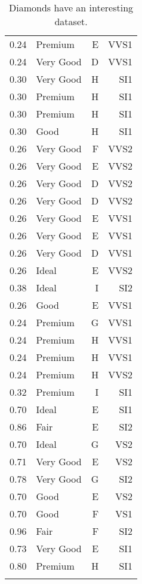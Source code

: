 \documentclass[12pt,english,nohyper]{tufte-handout}\usepackage[]{graphicx}\usepackage[]{color}
\begin{document}
\begin{fullwidth}
\begin{longtable}{r|lr|r}
  0.24 & Premium & E & VVS1 \\ 
  0.24 & Very Good & D & VVS1 \\ 
  0.30 & Very Good & H & SI1 \\ 
  0.30 & Premium & H & SI1 \\ 
  0.30 & Premium & H & SI1 \\ 
  0.30 & Good & H & SI1 \\ 
  0.26 & Very Good & F & VVS2 \\ 
  0.26 & Very Good & E & VVS2 \\ 
  0.26 & Very Good & D & VVS2 \\ 
  0.26 & Very Good & D & VVS2 \\ 
  0.26 & Very Good & E & VVS1 \\ 
  0.26 & Very Good & E & VVS1 \\ 
  0.26 & Very Good & D & VVS1 \\ 
  0.26 & Ideal & E & VVS2 \\ 
  0.38 & Ideal & I & SI2 \\ 
  0.26 & Good & E & VVS1 \\ 
  0.24 & Premium & G & VVS1 \\ 
  0.24 & Premium & H & VVS1 \\ 
  0.24 & Premium & H & VVS1 \\ 
  0.24 & Premium & H & VVS2 \\ 
  0.32 & Premium & I & SI1 \\ 
  0.70 & Ideal & E & SI1 \\ 
  0.86 & Fair & E & SI2 \\ 
  0.70 & Ideal & G & VS2 \\ 
  0.71 & Very Good & E & VS2 \\ 
  0.78 & Very Good & G & SI2 \\ 
  0.70 & Good & E & VS2 \\ 
  0.70 & Good & F & VS1 \\ 
  0.96 & Fair & F & SI2 \\ 
  0.73 & Very Good & E & SI1 \\ 
  0.80 & Premium & H & SI1 \\ 
   \hline
\hline
\caption{Diamonds have an interesting dataset.} 
\label{tab:mtcars}
\end{longtable}

\end{fullwidth}
\end{document}
